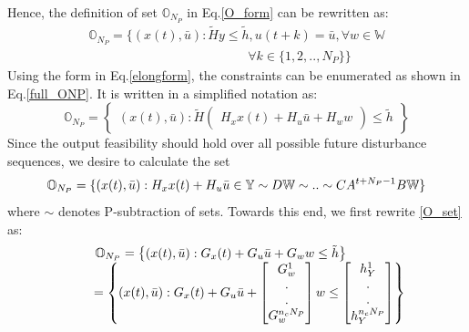 \documentclass[letterpaper, 10 pt, conference]{ieeeconf}  %
\begin{document}
  \fi
  Hence, the definition of set $\mathbb{O}_{N_P}$ in Eq.\eqref{O_form} can be rewritten as:
   \begin{equation}
   \begin{matrix}
   \mathbb{O}_{N_P} = \{(x(t),\bar{u}):\tilde{H}y\leq \tilde{h},  u(t+k)=\bar{u},\forall w \in \mathbb{W}  \\ \hspace{150pt} \forall k \in \{1,2,..,N_P\} \}
   \end{matrix}
   \label{O_form}
   \end{equation}
Using the form in  Eq.\eqref{elongform}, the constraints can be enumerated as shown in Eq.\eqref{full_ONP}. It is written in a simplified notation as:
\begin{equation}
\mathbb{O}_{N_P}= \begin{Bmatrix}
(x(t),\bar{u}):
\tilde{H}
\begin{pmatrix}
H_xx(t) +
H_u\bar{u} +  
H_w
w
\end{pmatrix}
\leq
\tilde{h}
\end{Bmatrix}
\label{O_set}
\end{equation}
Since the output feasibility should hold over all possible future disturbance sequences, we desire to calculate the set
\begin{equation}
\small
\mathbb{O}_{N_P}=\{(x(t),\bar{u}): 	H_xx(t) +
H_u\bar{u}\in \mathbb{Y} \sim D\mathbb{W} \sim .. \sim CA^{t+N_P-1}B\mathbb{W}  \}
\end{equation}
where $\sim$ denotes P-subtraction of sets. Towards this end, we first rewrite \eqref{O_set} as: 
  \begin{equation}
  \small
  \begin{matrix}
  \hspace{-25pt}
  \mathbb{O}_{N_P}= \begin{Bmatrix}
  (x(t),\bar{u}):
  G_x(t) +
  G_u\bar{u} +  
  G_w
  w
  \leq
  \tilde{h}
  \end{Bmatrix}
  \\
  \hspace{20pt}
 = \begin{Bmatrix}
  (x(t),\bar{u}):
	G_x(t) +
  G_u\bar{u} +  
  \begin{bmatrix}
  G^1_w \\ . \\ . \\ G^{n_cN_P}_w
  \end{bmatrix}
  w
  \leq
  \begin{bmatrix}
  h_Y^1 \\ . \\ . \\ h_Y^{n_cN_P}
  \end{bmatrix}
  \end{Bmatrix}
  \end{matrix}
  \end{equation}
\end{document}
